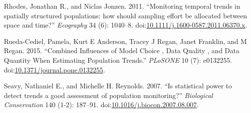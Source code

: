 \documentclass[12pt,]{article}
\begin{document}
\hypertarget{ref-Rhodes2011}{}
Rhodes, Jonathan R., and Niclas Jonzen. 2011. ``Monitoring temporal
trends in spatially structured populations: how should sampling effort
be allocated between space and time?'' \emph{Ecography} 34 (6): 1040--8.
doi:\href{https://doi.org/10.1111/j.1600-0587.2011.06370.x}{10.1111/j.1600-0587.2011.06370.x}.

\hypertarget{ref-Rueda-Cediel2015}{}
Rueda-Cediel, Pamela, Kurt E Anderson, Tracey J Regan, Janet Franklin,
and M Regan. 2015. ``Combined Influences of Model Choice , Data Quality
, and Data Quantity When Estimating Population Trends.'' \emph{PLoSONE}
10 (7): e0132255.
doi:\href{https://doi.org/10.1371/journal.pone.0132255}{10.1371/journal.pone.0132255}.

\hypertarget{ref-Seavy2007}{}
Seavy, Nathaniel E., and Michelle H. Reynolds. 2007. ``Is statistical
power to detect trends a good assessment of population monitoring?''
\emph{Biological Conservation} 140 (1-2): 187--91.
doi:\href{https://doi.org/10.1016/j.biocon.2007.08.007}{10.1016/j.biocon.2007.08.007}.
\end{document}
